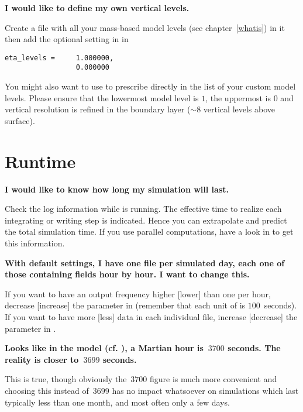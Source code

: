 \sk
\noindent \textbf{I would like to define my own vertical levels.}
\begin{finger}
\item Create a file  with all your mass-based model levels (see chapter~\ref{whatis}) in it then add the optional setting in  in 
\begin{verbatim}
eta_levels =     1.000000,
                 0.000000
\end{verbatim}
You might also want to use  to prescribe directly in  the list of your custom model levels. Please ensure that the lowermost model level is $1$, the uppermost is $0$ and vertical resolution is refined in the boundary layer ($\sim 8$ vertical levels above surface).
\end{finger}

\mk
\section{Runtime}

\sk
\noindent \textbf{I would like to know how long my simulation will last.}
\begin{finger}
\item Check the log information while  is running. The effective time to realize each integrating or writing step is indicated. Hence you can extrapolate and predict the total simulation time. If you use parallel computations, have a look in  to get this information.
\end{finger}

\sk
\noindent \textbf{With default settings, I have one  file per simulated day, each one of those containing fields hour by hour. I want to change this.}
\begin{finger}
\item If you want to have an output frequency higher [lower] than one per hour, decrease [increase] the parameter  in  (remember that each unit of  is $100$~seconds). If you want to have more [less] data in each individual file, increase [decrease] the parameter  in .
\end{finger}

\sk
\noindent \textbf{Looks like in the model (cf. ), a Martian hour is~$3700$ seconds. The reality is closer to~$3699$ seconds.}
\begin{finger}
\item This is true, though obviously the~$3700$ figure is much more convenient and choosing this instead of~$3699$ has no impact whatsoever on simulations which last typically less than one month, and most often only a few days. 
\end{finger}


